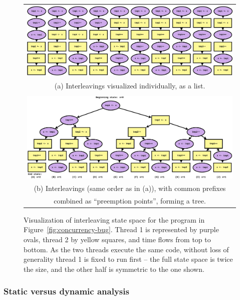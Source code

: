 \begin{figure}[p]
	\begin{tabular}{c}
		\includegraphics[width=\textwidth]{statespace-list.pdf}
		\\
		(a) Interleavings visualized individually, as a list.
		\\
		\\
		\includegraphics[width=\textwidth]{statespace-tree.pdf}
		\\
		(b) Interleavings (same order as in (a)), with common prefixes \\
		combined as ``preemption points'', forming a tree.
	\end{tabular}
	\caption{Visualization of interleaving state space for the program in Figure~\ref{fig:concurrency-bug}.
	Thread 1 is represented by purple ovals, thread 2 by yellow squares, and time flows from top to bottom.
	As the two threads execute the same code, without loss of generality thread 1 is fixed to run first --
	the full state space is twice the size, and the other half is symmetric to the one shown.}
	\label{fig:tree}
\end{figure}

\subsubsection{Static versus dynamic analysis}


